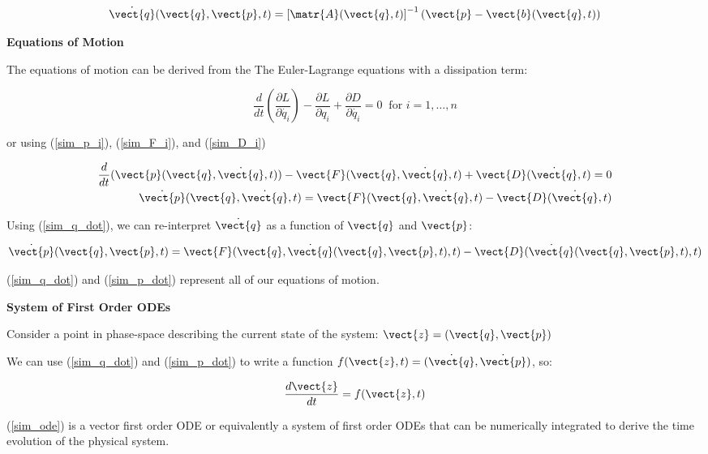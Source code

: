 \begin{align}
    \Dot{\vect{q}}(\vect{q}, \vect{p}, t) = \left[\matr{A}(\vect{q}, t)\right]^{-1} \left( \vect{p} - \vect{b}(\vect{q}, t) \right) \label{sim_q_dot}
\end{align}

\textbf{Equations of Motion}

The equations of motion can be derived from the The Euler-Lagrange equations with a dissipation term:

\[
    \frac{d}{d t} \left( \frac{\partial L}{\partial \Dot{q_i}} \right) - \frac{\partial L}{\partial q_i} + \frac{\partial D}{\partial \Dot{q_i}} = 0 \;\; \text{for } i = 1, \dots, n
\]

or using (\ref{sim_p_i}), (\ref{sim_F_i}), and (\ref{sim_D_i})

\begin{align*}
    \frac{d}{d t} (\vect{p}(\vect{q}, \Dot{\vect{q}}, t)) - \vect{F}(\vect{q}, \Dot{\vect{q}}, t) + \vect{D}(\Dot{\vect{q}}, t) = 0\\
    \Dot{\vect{p}}(\vect{q}, \Dot{\vect{q}}, t) = \vect{F}(\vect{q}, \Dot{\vect{q}}, t) - \vect{D}(\Dot{\vect{q}}, t)
\end{align*}

Using (\ref{sim_q_dot}), we can re-interpret $\Dot{\vect{q}}$ as a function of $\vect{q}$ and $\vect{p}$:

\begin{align}
    \Dot{\vect{p}}(\vect{q}, \vect{p}, t) = \vect{F}(\vect{q}, \Dot{\vect{q}}(\vect{q}, \vect{p}, t), t) - \vect{D}(\Dot{\vect{q}}(\vect{q}, \vect{p}, t), t) \label{sim_p_dot}
\end{align}

(\ref{sim_q_dot}) and (\ref{sim_p_dot}) represent all of our equations of motion.

\textbf{System of First Order ODEs}

Consider a point in phase-space describing the current state of the system: $\vect{z} = (\vect{q}, \vect{p})$

We can use (\ref{sim_q_dot}) and (\ref{sim_p_dot}) to write a function $f(\vect{z}, t) = (\Dot{\vect{q}}, \Dot{\vect{p}})$, so:

\begin{align}
    \frac{d \vect{z}}{d t} = f(\vect{z}, t) \label{sim_ode}
\end{align}

(\ref{sim_ode}) is a vector first order ODE or equivalently a system of first order ODEs that can be numerically integrated to derive the time evolution of the physical system.

